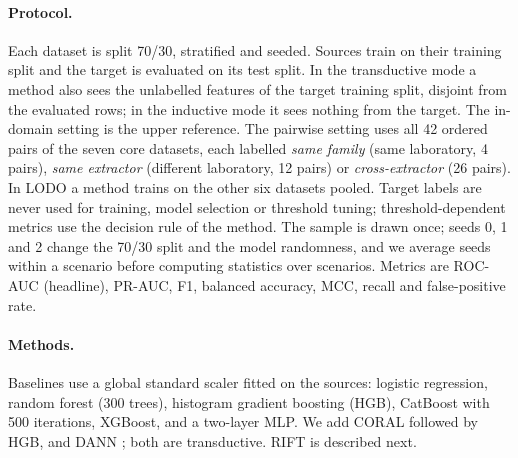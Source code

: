 \documentclass[11pt]{article}
\begin{document}
\paragraph{Protocol.}
Each dataset is split 70/30, stratified and seeded.
Sources train on their training split and the target is evaluated on its test split.
In the transductive mode a method also sees the unlabelled features of the target training split, disjoint from the evaluated rows; in the inductive mode it sees nothing from the target.
The in-domain setting is the upper reference.
The pairwise setting uses all 42 ordered pairs of the seven core datasets, each labelled \emph{same family} (same laboratory, 4 pairs), \emph{same extractor} (different laboratory, 12 pairs) or \emph{cross-extractor} (26 pairs).
In LODO a method trains on the other six datasets pooled.
Target labels are never used for training, model selection or threshold tuning; threshold-dependent metrics use the decision rule of the method.
The sample is drawn once; seeds 0, 1 and 2 change the 70/30 split and the model randomness, and we average seeds within a scenario before computing statistics over scenarios.
Metrics are ROC-AUC (headline), PR-AUC, F1, balanced accuracy, MCC, recall and false-positive rate.

\paragraph{Methods.}
Baselines use a global standard scaler fitted on the sources: logistic regression, random forest (300 trees), histogram gradient boosting (HGB), CatBoost \citep{prokhorenkova2018catboost} with 500 iterations, XGBoost, and a two-layer MLP.
We add CORAL \citep{sun2016coral} followed by HGB, and DANN \citep{ganin2016dann}; both are transductive.
RIFT is described next.
\end{document}
